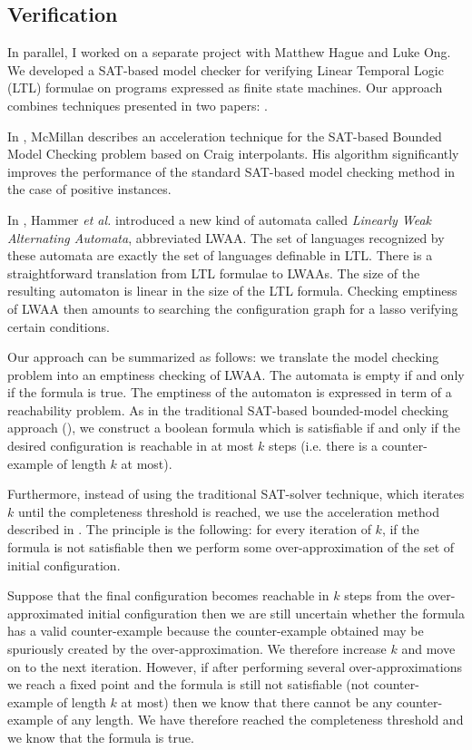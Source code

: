 \subsection{Verification}

In parallel, I worked on a separate project with Matthew Hague and
Luke Ong. We developed a SAT-based  model checker for verifying
Linear Temporal Logic (LTL) formulae on programs expressed as finite
state machines. Our approach combines techniques presented in two
papers: \cite{hammer:truly, DBLP:conf/cav/McMillan03}.

In \cite{DBLP:conf/cav/McMillan03}, McMillan describes an
acceleration technique for the SAT-based Bounded Model Checking
problem based on Craig interpolants. His algorithm significantly
improves the performance of the standard SAT-based model checking
method in the case of positive instances.

In \citep{hammer:truly}, Hammer \emph{et al.} introduced a new kind
of automata called \emph{Linearly Weak Alternating Automata},
abbreviated LWAA. The set of languages recognized by these automata
are exactly the set of languages definable in LTL. There is a
straightforward translation from LTL formulae to LWAAs. The size of
the resulting automaton is linear in the size of the LTL formula.
Checking emptiness of LWAA then amounts to searching the
configuration graph for a lasso verifying certain conditions.

Our approach can be summarized as follows: we translate the model
checking problem into an emptiness checking of LWAA. The automata is
empty if and only if the formula is true. The emptiness of the
automaton is expressed in term of a reachability problem. As in the
traditional SAT-based bounded-model checking approach
(\cite{biere99symbolic}), we construct a boolean formula which is
satisfiable if and only if the desired configuration is reachable in
at most $k$ steps (i.e. there is a counter-example of length $k$ at
most).

Furthermore, instead of using the traditional SAT-solver technique,
which iterates $k$ until the completeness threshold is reached, we
use the acceleration method described in
\cite{DBLP:conf/cav/McMillan03}. The principle is the following: for
every iteration of $k$, if the formula is not satisfiable then we
perform some over-approximation of the set of initial configuration.

Suppose that the final configuration becomes reachable in $k$ steps
from the over-approximated initial configuration then we are still
uncertain whether the formula has a valid counter-example because
the counter-example obtained may be spuriously created by the
over-approximation. We therefore increase $k$ and move on to the
next iteration. However, if after performing several
over-approximations we reach a fixed point and the formula is still
not satisfiable (not counter-example of length $k$ at most) then we
know that there cannot be any counter-example of any length. We have
therefore reached the completeness threshold and we know that the
formula is true.


